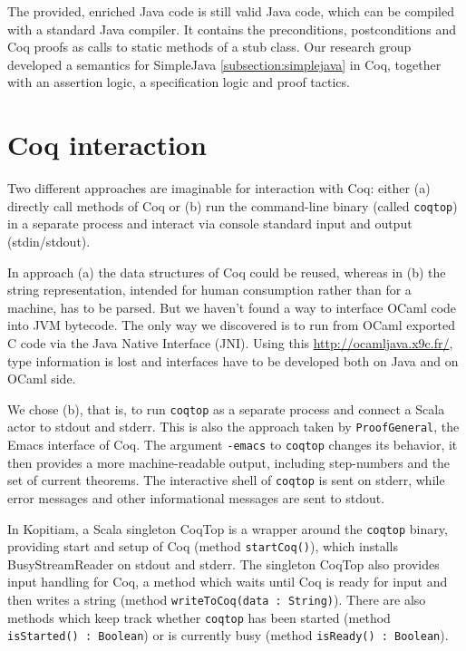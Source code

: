 \documentclass{article}
\begin{document}
The provided, enriched Java code is still valid Java code, which can be compiled with a standard Java compiler. It contains the preconditions, postconditions and Coq proofs as calls to static methods of a stub class. Our research group developed a semantics for SimpleJava \ref{subsection:simplejava} in Coq, together with an assertion logic, a specification logic and proof tactics.

\section{Coq interaction} \label{section:coq}
Two different approaches are imaginable for interaction with Coq: either (a) directly call methods of Coq or (b) run the command-line binary (called \texttt{coqtop}) in a separate process and interact via console standard input and output (stdin/stdout).

In approach (a) the data structures of Coq could be reused, whereas in (b) the string representation, intended for human consumption rather than for a machine, has to be parsed. But we haven't found a way to interface OCaml code into JVM bytecode. The only way we discovered is to run from OCaml exported C code via the Java Native Interface (JNI). Using this \url{http://ocamljava.x9c.fr/}, type information is lost and interfaces have to be developed both on Java and on OCaml side.

We chose (b), that is, to run \texttt{coqtop} as a separate process and connect a Scala actor to stdout and stderr. This is also the approach taken by \texttt{ProofGeneral}, the Emacs interface of Coq. The argument \texttt{-emacs} to \texttt{coqtop} changes its behavior, it then provides a more machine-readable output, including step-numbers and the set of current theorems. The interactive shell of \texttt{coqtop} is sent on stderr, while error messages and other informational messages are sent to stdout.

In Kopitiam, a Scala singleton CoqTop is a wrapper around the \texttt{coqtop} binary, providing start and setup of Coq (method \texttt{startCoq()}), which installs BusyStreamReader on stdout and stderr. The singleton CoqTop also provides input handling for Coq, a method which waits until Coq is ready for input and then writes a string (method \texttt{writeToCoq(data : String)}). There are also methods which keep track whether \texttt{coqtop} has been started (method \texttt{isStarted() : Boolean}) or is currently busy (method \texttt{isReady() : Boolean}).
\end{document}
